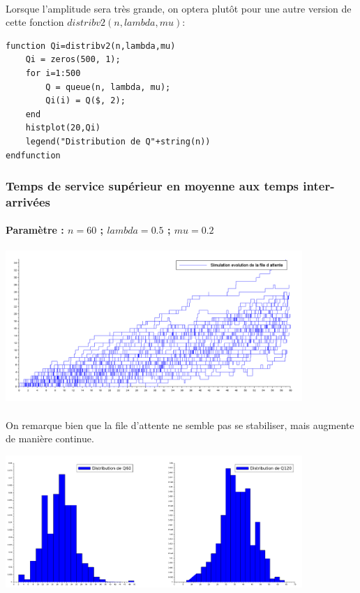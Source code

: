 \documentclass{article}
\begin{document}
\paragraph{}
Lorsque l'amplitude sera très grande, on optera plutôt pour une autre version de cette fonction $distribv2(n,lambda,mu)$: 
\begin{verbatim}
function Qi=distribv2(n,lambda,mu)
    Qi = zeros(500, 1);
    for i=1:500
        Q = queue(n, lambda, mu);
        Qi(i) = Q($, 2);
    end
    histplot(20,Qi)
    legend("Distribution de Q"+string(n))
endfunction
\end{verbatim}

\subsubsection{Temps de service supérieur en moyenne aux temps inter-arrivées}
\paragraph{Paramètre : $n=60$ ; $lambda=0.5$ ; $mu=0.2$}
\begin{center}
	\includegraphics[width=425px]{img/inf.PNG}
\end{center}
\paragraph{} On remarque bien que la file d'attente ne semble pas se stabiliser, mais augmente de manière continue.
\begin{center}
	\includegraphics[width=425px]{img/sup/dist.png}
\end{center}
\end{document}

